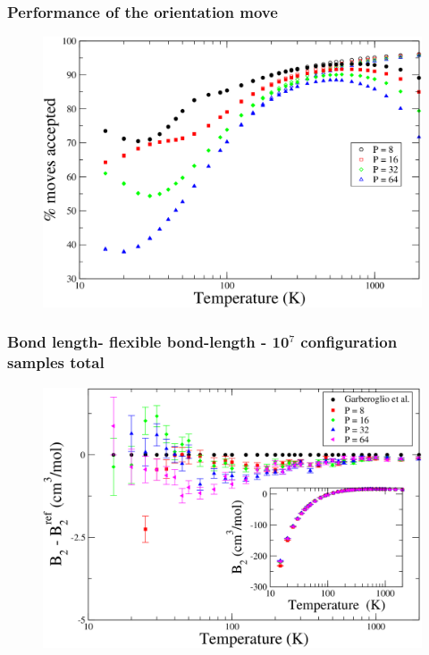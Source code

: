 \documentclass[xcolor=svgnames]{beamer}
\begin{document}
            \begin{frame}
                \frametitle{Performance of the orientation move}
                \begin{figure}
                    \centering
                    \includegraphics[scale=0.18,keepaspectratio]{s12orAcc.png}
                \end{figure}
            \end{frame}
            \begin{frame}
                \frametitle{Bond length- flexible bond-length - 10$^7$ configuration samples total}
                \begin{figure}
                    \centering
                    \includegraphics[scale=0.18,keepaspectratio]{s3GarberoglioAll.png}
                \end{figure}
            \end{frame}
\end{document}
